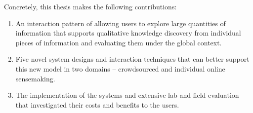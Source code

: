 Concretely, this thesis makes the following contributions:


\begin{enumerate}
    \item An interaction pattern of allowing users to explore  large quantities of information that supports qualitative knowledge discovery from individual pieces of information and evaluating them under the global context.

    \item Five novel system designs and interaction techniques that can better support this new model in two domains -- crowdsourced and individual online sensemaking.

    \item The implementation of the systems and extensive lab and field evaluation that investigated their costs and benefits to the users.
\end{enumerate}

